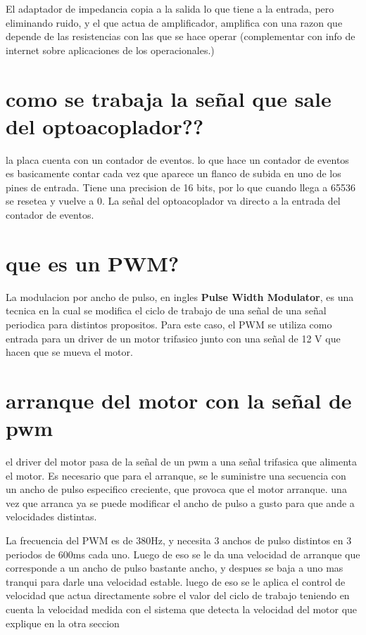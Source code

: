 \documentclass[a4paper]{article}
\begin{document}
El adaptador de impedancia copia a la salida lo que tiene a la entrada, pero eliminando ruido, y el que actua de amplificador, amplifica con una razon que depende de las resistencias con las que se hace operar (complementar con info de internet sobre aplicaciones de los operacionales.)

\section*{como se trabaja la señal que sale del optoacoplador??}
la placa cuenta con un contador de eventos. lo que hace un contador de eventos es basicamente contar cada vez que aparece un flanco de subida en uno de los pines de entrada. Tiene una precision de 16 bits, por lo que cuando llega a 65536 se resetea y vuelve a 0. La señal del optoacoplador va directo a la entrada del contador de eventos.

\section*{que es un PWM?}
La modulacion por ancho de pulso, en ingles \textbf{Pulse Width Modulator}, es una tecnica en la cual se modifica el ciclo de trabajo de una señal de una señal periodica para distintos propositos. Para este caso, el PWM se utiliza como entrada para un driver de un motor trifasico junto con una señal de 12 V que hacen que se mueva el motor.

\section*{arranque del motor con la señal de pwm}
el driver del motor pasa de la señal de un pwm a una señal trifasica que alimenta el motor. Es necesario que para el arranque, se le suministre una secuencia con un ancho de pulso especifico creciente, que provoca que el motor arranque. una vez que arranca ya se puede modificar el ancho de pulso a gusto para que ande a velocidades distintas.

La frecuencia del PWM es de 380Hz, y necesita 3 anchos de pulso distintos en 3 periodos de 600ms cada uno. Luego de eso se le da una velocidad de arranque que corresponde a un ancho de pulso bastante ancho, y despues se baja a uno mas tranqui para darle una velocidad estable. luego de eso se le aplica el control de velocidad que actua directamente sobre el valor del ciclo de trabajo teniendo en cuenta la velocidad medida con el sistema que detecta la velocidad del motor que explique en la otra seccion
\end{document}
